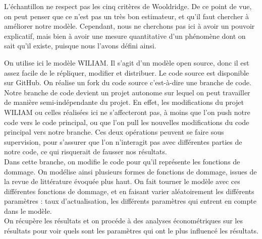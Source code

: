 L'échantillon ne respect pas les cinq critères de Wooldridge. De ce point de vue, on peut penser que ce n'est pas un très bon estimateur, et qu'il faut chercher à améliorer notre modèle. Cependant, nous ne cherchons pas ici à avoir un pouvoir explicatif, mais bien à avoir une mesure quantitative d'un phénomène dont on sait qu'il existe, puisque nous l'avons défini ainsi. 


\begin{methodbox}
On utilise ici le modèle WILIAM. Il s'agit d'un modèle open source, donc il est assez facile de le répliquer, modifier et distribuer. Le code source est disponible sur GitHub. On réalise un fork du code source c'est-à-dire une branche de code. Notre branche de code devient un projet autonome sur lequel on peut travailler de manière semi-indépendante du projet. En effet, les modifications du projet WILIAM ou celles réalisées ici ne s'affecteront pas, à moins que l'on push notre code vers le code principal, ou que l'on pull les nouvelles modifications du code principal vers notre branche. Ces deux opérations peuvent se faire sous supervision, pour s'assurer que l'on n'interagit pas avec différentes parties de notre code, ce qui risquerait de fausser nos résultats.  \\

Dans cette branche, on modifie le code pour qu'il représente les fonctions de dommage. On modélise ainsi plusieurs formes de fonctions de dommage, issues de la revue de littérature évoquée plus haut. On fait tourner le modèle avec ces différentes fonctions de dommage, et en faisant varier aléatoirement les différents paramètres : taux d'actualisation, les différents paramètres qui entrent en compte dans le modèle. \\

On récupère les résultats et on procéde à des analyses économétriques sur les résultats pour voir quels sont les paramètres qui ont le plus influencé les résultats. 

\end{methodbox}

